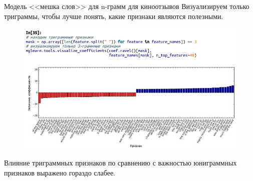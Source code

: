 \documentclass{beamer}
\begin{document}
\begin{frame}{Модель <<мешка слов>> для n-грамм для киноотзывов}
Визуализируем только триграммы, чтобы лучше понять, какие признаки являются полезными. 
\begin{figure}[h]
\centering
\includegraphics[scale=0.5]{images/lec09-pic36.png}
\end{figure}
Влияние триграммных признаков по сравнению с важностью юниграммных признаков выражено гораздо слабее.
\end{frame}
\end{document}

